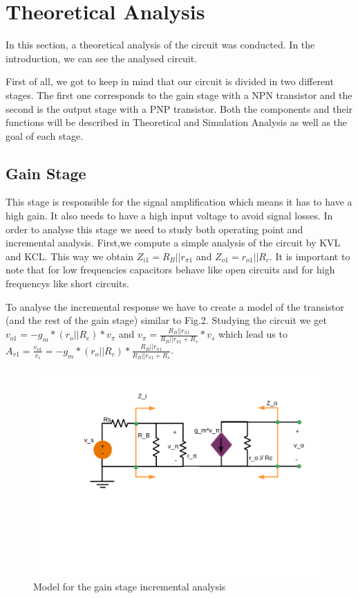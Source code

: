 \section{Theoretical Analysis} \label{section:theo}


\par In this section, a theoretical analysis of the circuit was conducted. In the introduction, we can see the analysed circuit.

First of all, we got to keep in mind that our circuit is divided in two different stages. The first one corresponds to the gain stage with a NPN transistor and the second is the output stage with a PNP transistor. Both the components and their functions will be described in Theoretical and Simulation Analysis as well as the goal of each stage.

\subsection{Gain Stage}
This stage is responsible for the signal amplification which means it has to have a high gain. It also needs to have a high input voltage to avoid signal losses. In order to analyse this stage we need to study both operating point and incremental analysis.
First,we compute a simple analysis of the circuit by KVL and KCL. This way we obtain $Z_{i1}=R_B||r_{\pi 1}$ and $Z_{o1}=r_{o1}||R_c$. It is important to note that for low frequencies capacitors behave like open circuits and for high frequencys like short circuits.

To analyse the incremental response we have to create a model of the transistor (and the rest of the gain stage) similar to Fig.2. Studying the circuit we get $v_{o1}=-g_m * (r_o||R_c) * v_{\pi}$ and $v_{\pi}= \frac{R_B||r_{\pi 1}}{R_B||r_{\pi 1}+R_s} * v_s $ which lead us to $A_{v1} = \frac{v_{o1}}{v_s} = -g_m * (r_o||R_c)*\frac{R_B||r_{\pi 1}}{R_B||r_{\pi 1}+R_s}$.


\begin{figure}[h] \centering
\includegraphics[width=0.8\linewidth]{Incremental_Gain.pdf}
\caption{Model for the gain stage incremental analysis}
\label{sdf}
\end{figure}

